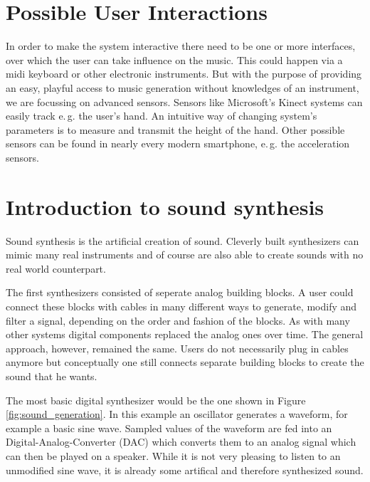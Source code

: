 	\section{Possible User Interactions}
	In order to make the system interactive there need to be one or more interfaces, over which the user can take influence on the music. This could happen via a midi keyboard or other electronic instruments. But with the purpose of providing an easy, playful access to music generation without knowledges of an instrument, we are focussing on advanced sensors. Sensors like Microsoft's Kinect systems can easily track e.\,g. the user's hand. An intuitive way of changing system's parameters is to measure and transmit the height of the hand. Other possible sensors can be found in nearly every modern smartphone, e.\,g. the acceleration sensors.
	
			
				
	\section{Introduction to sound synthesis}
		Sound synthesis is the artificial creation of sound. 
		Cleverly built synthesizers can mimic many real instruments 
		and of course are also able to create sounds with no real world counterpart.
		
		The first synthesizers consisted of seperate analog building blocks.
		A user could connect these blocks with cables in many different ways to generate, modify and filter a signal, depending on the order and fashion of the blocks.
		As with many other systems digital components replaced the analog ones over time.
		The general approach, however, remained the same. 
		Users do not necessarily plug in cables anymore but conceptually one still connects separate building blocks to create the sound that he wants.
		
		The most basic digital synthesizer would be the one shown in Figure \ref{fig:sound_generation}. 
		In this example an oscillator generates a waveform, for example a basic sine wave.
		Sampled values of the waveform are fed into an Digital-Analog-Converter (DAC) which converts them to an analog signal which can then be played on a speaker.
		While it is not very pleasing to listen to an unmodified sine wave, it is already some artifical and therefore synthesized sound.
		
